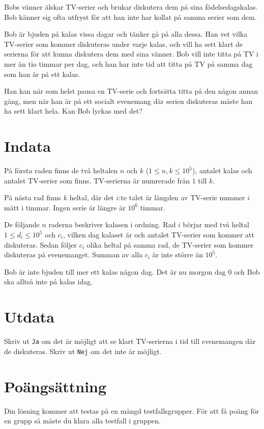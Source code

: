 Bobs vänner älskar TV-serier och brukar diskutera dem på sina födelsedagskalas. Bob känner sig ofta utfryst för att han inte har kollat på samma serier som dem.

Bob är bjuden på kalas vissa dagar och tänker gå på alla dessa. Han vet vilka TV-serier som kommer diskuteras under varje kalas, och vill ha sett klart de serierna för att kunna diskutera dem med sina vänner. Bob vill inte titta på TV i mer än tio timmar per dag, och han har inte tid att titta på TV på samma dag som han är på ett kalas.

Han kan när som helst pausa en TV-serie och fortsätta titta på den någon annan gång, men när han är på ett socialt evenemang där serien diskuteras måste han ha sett klart hela. Kan Bob lyckas med det?

\section*{Indata}
På första raden finns de två heltalen $n$ och $k$ ($1 \leq n,k \leq 10^5$), antalet kalas och antalet TV-serier som finns. TV-serierna är numrerade från $1$ till $k$.

På nästa rad finns $k$ heltal, där det $i$:te talet är längden av TV-serie nummer $i$ mätt i timmar. Ingen serie är längre är $10^6$ timmar.

De följande $n$ raderna beskriver kalasen i ordning. Rad $i$ börjar med två heltal $1 \leq d_i \leq 10^5$ och $c_i$, vilken dag kalaset är och antalet TV-serier som kommer att diskuteras. Sedan följer $c_i$ olika heltal på samma rad, de TV-serier som kommer diskuteras på evenemanget. Summan av alla $c_i$ är inte större än $10^5$.

Bob är inte bjuden till mer ett kalas någon dag. Det är nu morgon dag $0$ och Bob ska alltså inte på kalas idag.

\section*{Utdata}
Skriv ut \texttt{Ja} om det är möjligt att se klart TV-serierna i tid till evenemangen där de diskuteras. Skriv ut \texttt{Nej} om det inte är möjligt.

\section*{Poängsättning}
Din lösning kommer att testas på en mängd testfallsgrupper.
För att få poäng för en grupp så måste du klara alla testfall i gruppen.

